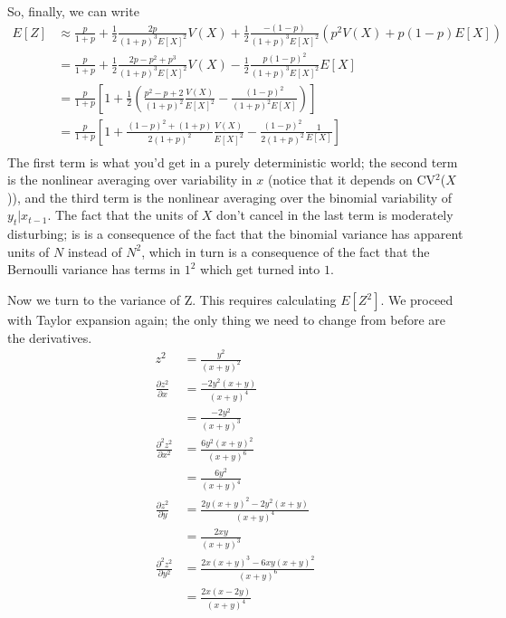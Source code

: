 \documentclass[
]{article}
\begin{document}
So, finally, we can write \[
\begin{aligned}
E[Z] &\approx \frac{p}{1+p} + \frac{1}{2}\frac{2p}{(1+p)^3 E[X]^2}V(X)+\frac{1}{2}\frac{-(1-p)}{(1+p)^3 E[X]^2}(p^2 V(X) + p(1-p) E[X])\\
  &=\frac{p}{1+p} + \frac{1}{2}\frac{2p - p^2 + p^3}{(1+p)^3 E[X]^2}V(X) -\frac{1}{2}\frac{p(1-p)^2}{(1+p)^3 E[X]^2}E[X]\\
  &= \frac{p}{1+p} \left[1 + \frac{1}{2} \left(\frac{p^2 - p + 2}{(1+p)^2} \frac{V(X)}{E[X]^2} - \frac{(1-p)^2}{(1+p)^2 E[X]}\right) \right] \\
  &= \frac{p}{1+p} \left[1 +  \frac{(1-p)^2 +(1+p)}{2(1+p)^2} \frac{V(X)}{E[X]^2} - \frac{(1-p)^2}{2(1+p)^2} \frac{1}{E[X]}   \right] \\
\end{aligned}
\] The first term is what you'd get in a purely deterministic world; the
second term is the nonlinear averaging over variability in \(x\) (notice
that it depends on CV\(^2\)(\(X\))), and the third term is the nonlinear
averaging over the binomial variability of \(y_t | x_{t-1}\). The fact
that the units of \(X\) don't cancel in the last term is moderately
disturbing; is is a consequence of the fact that the binomial variance
has apparent units of \(N\) instead of \(N^2\), which in turn is a
consequence of the fact that the Bernoulli variance has terms in \(1^2\)
which get turned into \(1\).

Now we turn to the variance of Z. This requires calculating \(E[Z^2]\).
We proceed with Taylor expansion again; the only thing we need to change
from before are the derivatives. \[
\begin{aligned}
z^2 &= \frac{y^2}{(x+y)^2}\\
\frac{\partial z^2}{\partial x} &= \frac{-2y^2(x+y)}{(x+y)^4}\\
  &= \frac{-2y^2}{(x+y)^3}\\
\frac{\partial^2 z^2}{\partial x^2} &= \frac{6y^2(x+y)^2}{(x+y)^6}\\
    &= \frac{6y^2}{(x+y)^4}\\
\frac{\partial z^2}{\partial y} &= \frac{2y(x+y)^2-2y^2(x+y)}{(x+y)^4}\\
    &= \frac{2xy}{(x+y)^3}\\
\frac{\partial^2 z^2}{\partial y^2} &= \frac{2x(x+y)^3-6xy(x+y)^2}{(x+y)^6}\\
    &= \frac{2x(x-2y)}{(x+y)^4}\\
\end{aligned}
\]
\end{document}
